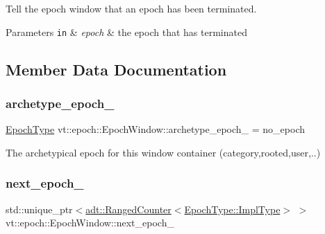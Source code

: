 Tell the epoch window that an epoch has been terminated. 


\begin{DoxyParams}[1]{Parameters}
\mbox{\tt in}  & {\em epoch} & the epoch that has terminated \\
\hline
\end{DoxyParams}


\subsection{Member Data Documentation}
\mbox{\label{structvt_1_1epoch_1_1_epoch_window_a74c5c529d1a7fddf5f2d7a5cb9dbe4af}} 
\subsubsection{\texorpdfstring{archetype\+\_\+epoch\+\_\+}{archetype\_epoch\_}}
{\footnotesize\ttfamily \hyperlink{structvt_1_1epoch_1_1_epoch_type}{Epoch\+Type} vt\+::epoch\+::\+Epoch\+Window\+::archetype\+\_\+epoch\+\_\+ = no\+\_\+epoch\hspace{0.3cm}{\ttfamily [private]}}



The archetypical epoch for this window container (category,rooted,user,..) 

\mbox{\label{structvt_1_1epoch_1_1_epoch_window_a962a9c46d450a13ccfd9bf4b822bf527}} 
\subsubsection{\texorpdfstring{next\+\_\+epoch\+\_\+}{next\_epoch\_}}
{\footnotesize\ttfamily std\+::unique\+\_\+ptr$<$\hyperlink{namespacevt_1_1adt_a075b41b03183cb280d453f44d5397637}{adt\+::\+Ranged\+Counter}$<$\hyperlink{structvt_1_1epoch_1_1_epoch_type_aef70d29ac80a421e67bc15ffbe9b9e70}{Epoch\+Type\+::\+Impl\+Type}$>$ $>$ vt\+::epoch\+::\+Epoch\+Window\+::next\+\_\+epoch\+\_\+\hspace{0.3cm}{\ttfamily [private]}}


